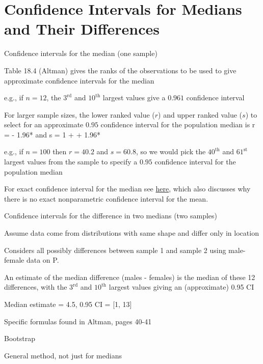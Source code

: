 \section{Confidence Intervals for Medians and Their Differences} \label{sec:nonpar-clmed}
\bi 
\item Confidence intervals for the median (one sample)
\bi 
\item Table 18.4 (Altman) gives the ranks of the observations to be
  used to give approximate confidence intervals for the median 
\item e.g., if $n = 12$, the $3^\textrm{rd}$ and $10^\textrm{th}$
  largest values give a $0.961$ confidence interval 
\item For larger sample sizes, the lower ranked value ($r$) and upper
  ranked value ($s$) to select for an approximate $0.95$ confidence
  interval for the population median is 
\beq
r =  - 1.96* \hspace{.4cm}\textrm{and}
\hspace{.4cm} s = 1 +  + 1.96* 
\eeq
\item e.g., if $n = 100$ then $r = 40.2$ and $s = 60.8$, so we would pick the $40^\textrm{th}$ and $61^\textrm{st}$ largest values from the sample to specify a $0.95$ confidence interval for the population median
\item For exact confidence interval for the median see
  \href{https://stats.stackexchange.com/questions/186957}{here}, which
  also discusses why there is no exact nonparametric confidence
  interval for the mean.
\ei
\item Confidence intervals for the difference in two medians (two samples)
\bi
\item Assume data come from distributions with same shape and differ only in location
\item Considers all possibly differences between sample 1 and sample 2
  using male-female data on P.~\pageref{pg:nonpar-mf}
\item An estimate of the median difference (males - females) is the median of these 12 differences, with the $3^\textrm{rd}$ and $10^\textrm{th}$ largest values giving an (approximate) 0.95 CI
\item Median estimate = 4.5, 0.95 CI = [1, 13]
\item Specific formulas found in Altman, pages 40-41
\ei
\item Bootstrap 
\bi
\item General method, not just for medians
